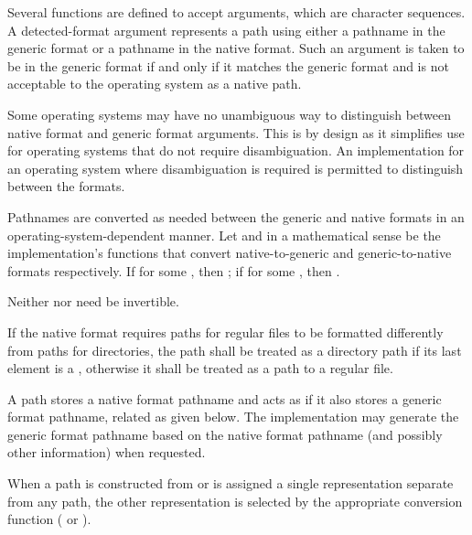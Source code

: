 \pnum
Several functions are defined to accept  arguments,
which are character sequences. A detected-format argument represents a path
using either a pathname in the generic format
or a pathname in the native format.
Such an argument is taken to be in the generic format if and only if
it matches the generic format and is not acceptable to the operating system
as a native path.

\pnum
\begin{note}
Some operating systems may have no unambiguous way to distinguish between native format and generic format arguments.
This is by design as it simplifies use for operating systems that do not require
disambiguation. An implementation for an operating system where disambiguation
is required is permitted to distinguish between the formats.
\end{note}

\pnum
Pathnames are converted as needed between the generic and native formats
in an operating-system-dependent manner.
Let  and  in a mathematical sense
be the implementation's functions that convert native-to-generic
and generic-to-native formats respectively.
If  for some , then ;
if  for some , then .
\begin{note}
Neither  nor  need be invertible.
\end{note}

\pnum
If the native format requires paths for regular files to be formatted
differently from paths for directories, the path shall be treated as a directory
path if its last element is a ,
otherwise it shall be treated as a path to a regular file.

\pnum
\begin{note}
A path stores a native format pathname
and acts as if it also stores a generic format pathname,
related as given below.
The implementation may generate the generic format pathname
based on the native format pathname (and possibly other information)
when requested.
\end{note}

\pnum
When a path is constructed from or is assigned a single representation
separate from any path, the other representation is selected
by the appropriate conversion function ( or ).


